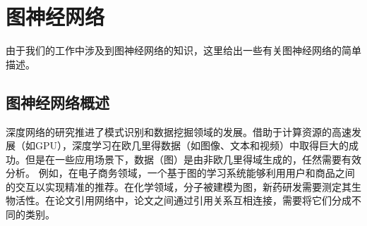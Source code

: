 
\section{图神经网络}
由于我们的工作中涉及到图神经网络的知识，这里给出一些有关图神经网络的简单描述。
\subsection{图神经网络概述}

深度网络的研究推进了模式识别和数据挖掘领域的发展。借助于计算资源的高速发展（如GPU），深度学习在欧几里得数据（如图像、文本和视频）中取得巨大的成功。但是在一些应用场景下，数据（图）是由非欧几里得域生成的，任然需要有效分析。
例如，在电子商务领域，一个基于图的学习系统能够利用用户和商品之间的交互以实现精准的推荐。在化学领域，分子被建模为图，新药研发需要测定其生物活性。在论文引用网络中，论文之间通过引用关系互相连接，需要将它们分成不同的类别。

